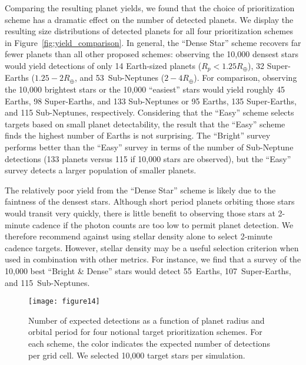 \documentclass[twocolumn]{aastex62}
\begin{document}
Comparing the resulting planet yields, we found that the choice of prioritization scheme has a dramatic effect on the number of detected planets. We display the resulting size distributions of detected planets for all four prioritization schemes in Figure~\ref{fig:yield_comparison}. In general, the ``Dense Star'' scheme recovers far fewer planets than all other proposed schemes: observing the 10,000 densest stars would yield detections of only 14 Earth-sized planets ($R_p < 1.25 R_\oplus$), 32 Super-Earths ($1.25-2 R_\oplus$, and 53~Sub-Neptunes ($2-4 R_\oplus$). For comparison, observing the 10,000 brightest stars or the 10,000 ``easiest'' stars would yield roughly 45 Earths, 98 Super-Earths, and 133 Sub-Neptunes or 95 Earths, 135 Super-Earths, and 115 Sub-Neptunes, respectively. Considering that the ``Easy'' scheme selects targets based on small planet detectability, the result that the ``Easy'' scheme finds the highest number of Earths is not surprising. The ``Bright'' survey performs better than the ``Easy'' survey in terms of the number of Sub-Neptune detections (133 planets versus 115 if 10,000 stars are observed), but the ``Easy'' survey detects a larger population of smaller planets. 

The relatively poor yield from the ``Dense Star'' scheme is likely due to the faintness of the densest stars. Although short period planets orbiting those stars would transit very quickly, there is little benefit to observing those stars at 2-minute cadence if the photon counts are too low to permit planet detection. We therefore recommend against using stellar density alone to select 2-minute cadence targets. However, stellar density may be a useful selection criterion when used in combination with other metrics. For instance, we find that a survey of the 10,000 best ``Bright \& Dense'' stars would detect 55~Earths, 107~Super-Earths, and 115~Sub-Neptunes.

\begin{figure}[tbp]
    \centering
     \texttt{[image: figure14]}\\
    \caption{Number of expected detections as a function of planet radius and orbital period for four notional target prioritization schemes. For each scheme, the color indicates the expected number of detections per grid cell. We selected 10,000 target stars per simulation.} \label{fig:small_yields}
\end{figure}
\end{document}
